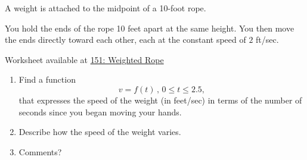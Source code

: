 \documentclass{ximera}
\begin{document}
\begin{exercise}
A weight is attached to the midpoint of a 10-foot rope.

You hold the ends of the rope 10 feet apart at the same height. You then move the ends directly toward each other, each at the constant speed of $2$ ft/sec.


\begin{onlineOnly}
    \begin{center}
\end{center}
\end{onlineOnly}

Worksheet available at \href{https://www.desmos.com/calculator/grostrmdln}{151: Weighted Rope}



\begin{enumerate}
\item Find a function 
\[
    v = f(t) \, , \, 0\leq t \leq 2.5 ,
\]
that expresses the speed of the weight (in feet/sec) in terms of the number of seconds since you began moving your hands.

\item Describe how the speed of the weight varies.

\item Comments?

\end{enumerate} 
\end{exercise}
\end{document}
